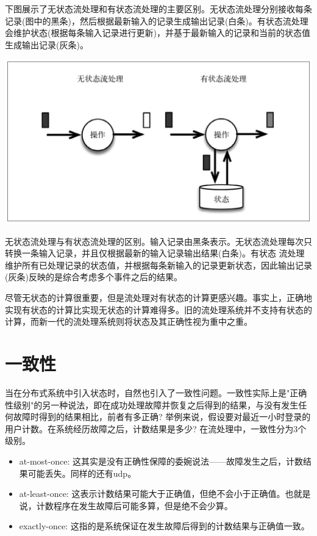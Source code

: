 \documentclass[oneside]{ctexbook}
\begin{document}
下图展示了无状态流处理和有状态流处理的主要区别。无状态流处理分别接收每条记录(图中的黑条)，然后根据最新输入的记录生成输出记录(白条)。有状态流处理会维护状态(根据每条输入记录进行更新)，并基于最新输入的记录和当前的状态值生成输出记录(灰条)。

\noindent \includegraphics[width=\textwidth]{statevsunstate.png}

无状态流处理与有状态流处理的区别。输入记录由黑条表示。无状态流处理每次只转换一条输入记录，并且仅根据最新的输入记录输出结果(白条)。有状态 流处理维护所有已处理记录的状态值，并根据每条新输入的记录更新状态，因此输出记录(灰条)反映的是综合考虑多个事件之后的结果。

尽管无状态的计算很重要，但是流处理对有状态的计算更感兴趣。事实上，正确地实现有状态的计算比实现无状态的计算难得多。旧的流处理系统并不支持有状态的计算，而新一代的流处理系统则将状态及其正确性视为重中之重。

\section{一致性}

当在分布式系统中引入状态时，自然也引入了一致性问题。一致性实际上是"正确性级别"的另一种说法，即在成功处理故障并恢复之后得到的结果，与没有发生任何故障时得到的结果相比，前者有多正确? 举例来说，假设要对最近一小时登录的用户计数。在系统经历故障之后，计数结果是多少? 在流处理中，一致性分为3个级别。

\begin{itemize}
\item at-most-once: 这其实是没有正确性保障的委婉说法——故障发生之后，计数结果可能丢失。同样的还有udp。
\item at-least-once: 这表示计数结果可能大于正确值，但绝不会小于正确值。也就是说，计数程序在发生故障后可能多算，但是绝不会少算。
\item exactly-once: 这指的是系统保证在发生故障后得到的计数结果与正确值一致。
\end{itemize}
\end{document}
